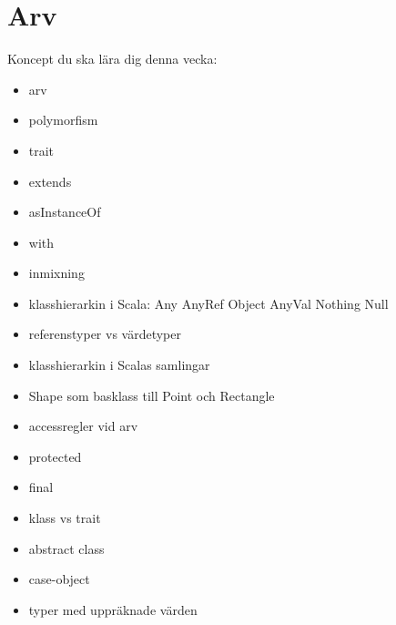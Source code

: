 \chapter{Arv}\label{chapter:W07}
Koncept du ska lära dig denna vecka:
\begin{multicols}{2}\begin{itemize}[nosep,label={$\square$},leftmargin=*]
\item arv
\item polymorfism
\item trait
\item extends
\item asInstanceOf
\item with
\item inmixning
\item klasshierarkin i Scala: Any AnyRef Object AnyVal Nothing Null
\item referenstyper vs värdetyper
\item klasshierarkin i Scalas samlingar
\item Shape som basklass till Point och Rectangle
\item accessregler vid arv
\item protected
\item final
\item klass vs trait
\item abstract class
\item case-object
\item typer med uppräknade värden\end{itemize}\end{multicols}
